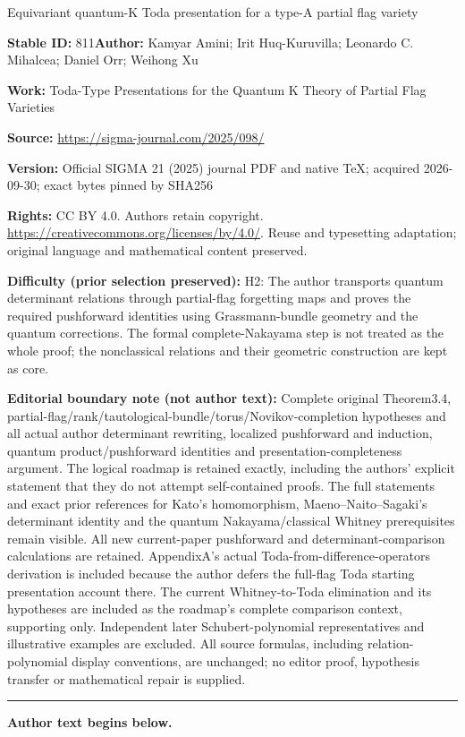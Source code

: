 \documentclass[11pt]{article}
\numberwithin{equation}{section}
\numberwithin{equation}{section}
\theoremstyle{definition}
\begin{document}
\begin{center}\Large Equivariant quantum-K Toda presentation for a type-A partial flag variety\end{center}
\noindent\textbf{Stable ID:} 811\quad\textbf{Author:} Kamyar Amini; Irit Huq-Kuruvilla; Leonardo C. Mihalcea; Daniel Orr; Weihong Xu\par
\noindent\textbf{Work:} Toda-Type Presentations for the Quantum K Theory of Partial Flag Varieties\par
\noindent\textbf{Source:} \url{https://sigma-journal.com/2025/098/}\par
\noindent\textbf{Version:} Official SIGMA 21 (2025) journal PDF and native TeX; acquired 2026-09-30; exact bytes pinned by SHA256\par
\noindent\textbf{Rights:} CC BY 4.0. Authors retain copyright. \url{https://creativecommons.org/licenses/by/4.0/}. Reuse and typesetting adaptation; original language and mathematical content preserved.\par
\noindent\textbf{Difficulty (prior selection preserved):} {\CJKfont H2: The author transports quantum determinant relations through partial-flag forgetting maps and proves the required pushforward identities using Grassmann-bundle geometry and the quantum corrections. The formal complete-Nakayama step is not treated as the whole proof; the nonclassical relations and their geometric construction are kept as core.}\par
\medskip\noindent\textbf{Editorial boundary note (not author text):} Complete original Theorem3.4, partial-flag/rank/tautological-bundle/torus/Novikov-completion hypotheses and all actual author determinant rewriting, localized pushforward and induction, quantum product/pushforward identities and presentation-completeness argument. The logical roadmap is retained exactly, including the authors’ explicit statement that they do not attempt self-contained proofs. The full statements and exact prior references for Kato’s homomorphism, Maeno–Naito–Sagaki’s determinant identity and the quantum Nakayama/classical Whitney prerequisites remain visible. All new current-paper pushforward and determinant-comparison calculations are retained. AppendixA’s actual Toda-from-difference-operators derivation is included because the author defers the full-flag Toda starting presentation account there. The current Whitney-to-Toda elimination and its hypotheses are included as the roadmap’s complete comparison context, supporting only. Independent later Schubert-polynomial representatives and illustrative examples are excluded. All source formulas, including relation-polynomial display conventions, are unchanged; no editor proof, hypothesis transfer or mathematical repair is supplied.\par
\medskip\hrule\medskip\noindent\textbf{Author text begins below.}\par
\setcounter{section}{1}
\end{document}
